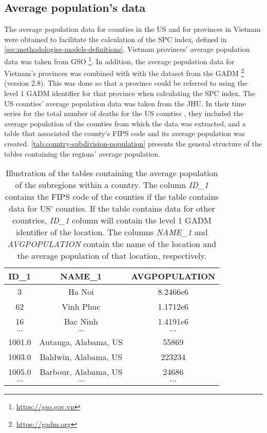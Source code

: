 \subsection{Average population's data}

The average population data for counties in the \gls{US} and for provinces in Vietnam were obtained to facilitate the calculation of the \gls{SPC} index, defined in \autoref{sec:methodologies-models-definitions}.
Vietnam provinces' average population data was taken from \gls{GSO} \footnote{\url{https://gso.gov.vn}}.
In addition, the average population data for Vietnam's provinces was combined with with the dataset from the \gls{GADM} \footnote{\url{https://gadm.org}} (version 2.8).
This was done so that a province could be referred to using the level 1 \gls{GADM} identifier for that province when calculating the \gls{SPC} index.
The \gls{US} counties' average population data was taken from the \gls{JHU}.
In their time series for the total number of deaths for the \gls{US} counties \cite{dongInteractiveWebbasedDashboard2020}, they included the average population of the counties from which the data was extracted, and a table that associated the county's \gls{FIPS} code and its average population was created.
\autoref{tab:country-subdivision-population} presents the general structure of the tables containing the regions' average population.

\begin{table}[h]
\centering
\begin{tabular}{| c | c | c |}
    ID\_1 & NAME\_1 & AVGPOPULATION \\
    \hline\hline
    3 & Ha Noi & 8.2466e6 \\
    \hline
    62 & Vinh Phuc & 1.1712e6 \\
    \hline
    16 & Bac Ninh & 1.4191e6 \\
    \hline
    $\cdots$ & $\cdots$ & $\cdots$ \\
    \hline
    1001.0 & Autauga, Alabama, US & 55869 \\
    \hline
    1003.0 & Baldwin, Alabama, US & 223234 \\
    \hline
    1005.0 & Barbour, Alabama, US & 24686 \\
    \hline
    $\cdots$ & $\cdots$ & $\cdots$ \\
\end{tabular}
\caption[JHU US population dataset structure]{Illustration of the tables containing the average population of the subregions within a country. The column \textit{ID\_1} contains the FIPS code of the counties if the table contains data for US' counties. If the table contains data for other countries, \textit{ID\_1} column will contain the level 1 GADM identifier of the location. The columns \textit{NAME\_1} and \textit{AVGPOPULATION} contain the name of the location and the average population of that location, respectively.}
\label{tab:country-subdivision-population}
\end{table}